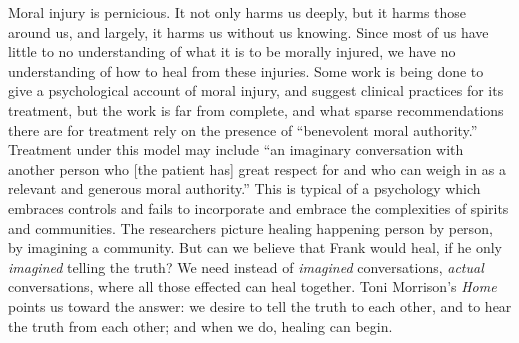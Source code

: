 \documentclass[12pt]{article}
\begin{document}
Moral injury is pernicious. It not only harms us deeply, but it harms those
around us, and largely, it harms us without us knowing. Since most of us have
little to no understanding of what it is to be morally injured, we have no
understanding of how to heal from these injuries. Some work is being done to
give a psychological account of moral injury, and suggest clinical practices
for its treatment,\autocite{Litz09} but the work is far from complete, and what
sparse recommendations there are for treatment rely on the presence of
``benevolent moral authority.''\autocite[\S 7.2]{Litz09} Treatment under this
model may include ``an imaginary conversation with another person who [the
patient has] great respect for and who can weigh in as a relevant and generous
moral authority.''\autocite[\S 7.2.5]{Litz09} This is typical of a psychology
which embraces controls and fails to incorporate and embrace the complexities
of spirits and communities. The researchers picture healing happening person by
person, by imagining a community. But can we believe that Frank would heal, if
he only \emph{imagined} telling the truth? We need instead of \emph{imagined}
conversations, \emph{actual} conversations, where all those effected can heal
together. Toni Morrison's \emph{Home} points us toward the answer: we desire to
tell the truth to each other, and to hear the truth from each other; and when
we do, healing can begin.






 
\end{document}
